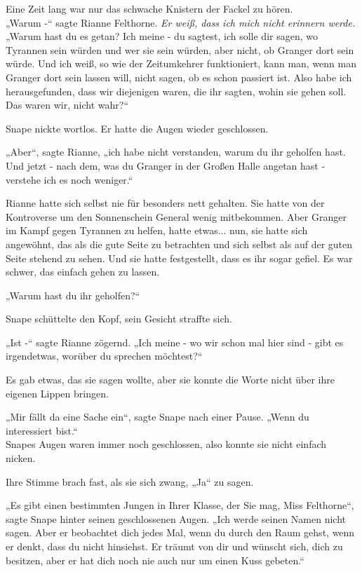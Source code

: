 {Eine Zeit lang war nur das schwache Knistern der Fackel zu hören.\\ „Warum -“ sagte Rianne Felthorne. \emph{Er weiß, dass ich mich nicht erinnern werde.} „Warum hast du es getan? Ich meine - du sagtest, ich solle dir sagen, wo Tyrannen sein würden und wer sie sein würden, aber nicht, ob Granger dort sein würde. Und ich weiß, so wie der Zeitumkehrer funktioniert, kann man, wenn man Granger dort sein lassen will, nicht sagen, ob es schon passiert ist. Also habe ich herausgefunden, dass wir diejenigen waren, die ihr sagten, wohin sie gehen soll. Das waren wir, nicht wahr?“

Snape nickte wortlos. Er hatte die Augen wieder geschlossen.

„Aber“, sagte Rianne, „ich habe nicht verstanden, warum du ihr geholfen hast. Und jetzt - nach dem, was du Granger in der Großen Halle angetan hast - verstehe ich es noch weniger.“

Rianne hatte sich selbst nie für besonders nett gehalten. Sie hatte von der Kontroverse um den Sonnenschein General wenig mitbekommen. Aber Granger im Kampf gegen Tyrannen zu helfen, hatte etwas... nun, sie hatte sich angewöhnt, das als die gute Seite zu betrachten und sich selbst als auf der guten Seite stehend zu sehen. Und sie hatte festgestellt, dass es ihr sogar gefiel. Es war schwer, das einfach gehen zu lassen.

„Warum hast du ihr geholfen?“

Snape schüttelte den Kopf, sein Gesicht straffte sich.

„Ist -“ sagte Rianne zögernd. „Ich meine - wo wir schon mal hier sind - gibt es irgendetwas, worüber du sprechen möchtest?“

Es gab etwas, das sie sagen wollte, aber sie konnte die Worte nicht über ihre eigenen Lippen bringen.

„Mir fällt da eine Sache ein“, sagte Snape nach einer Pause. „Wenn du interessiert bist.“\\ Snapes Augen waren immer noch geschlossen, also konnte sie nicht einfach nicken.

Ihre Stimme brach fast, als sie sich zwang, „Ja“ zu sagen.

„Es gibt einen bestimmten Jungen in Ihrer Klasse, der Sie mag, Miss Felthorne“, sagte Snape hinter seinen geschlossenen Augen. „Ich werde seinen Namen nicht sagen. Aber er beobachtet dich jedes Mal, wenn du durch den Raum gehst, wenn er denkt, dass du nicht hinsiehst. Er träumt von dir und wünscht sich, dich zu besitzen, aber er hat dich noch nie auch nur um einen Kuss gebeten.“

}
